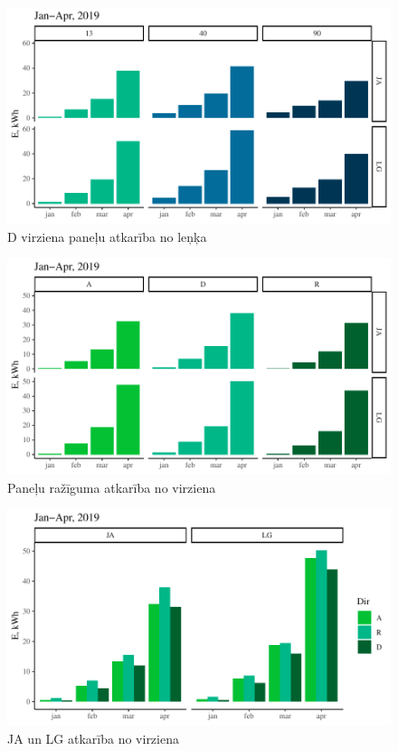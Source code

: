 \begin{figure}[h]
    \centering
    \includegraphics[width=\linewidth]{figures/results/jan_all_deg.pdf}
    \caption{D virziena paneļu atkarība no leņķa}
    \label{fig:ja_deg}
\end{figure}

\begin{figure}[h]
    \centering
    \includegraphics[width=\linewidth]{figures/results/jan_all_dir.pdf}
    \caption{Paneļu ražīguma atkarība no virziena}
    \label{fig:ja_dir}
\end{figure}

\begin{figure}[h]
    \centering
    \includegraphics[width=\linewidth]{figures/results/dirType.pdf}
    \caption{JA un LG atkarība no virziena}
    \label{fig:lg_ja_dir}
\end{figure}

